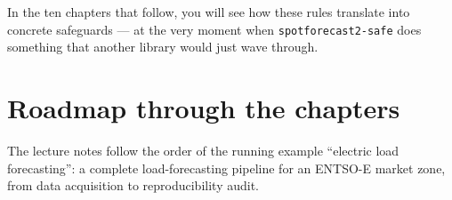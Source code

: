 \documentclass[
  english,
  letterpaper,
]{scrbook}
\begin{document}
In the ten chapters that follow, you will see how these rules translate
into concrete safeguards --- at the very moment when
\texttt{spotforecast2-safe} does something that another library would
just wave through.

\section*{Roadmap through the
chapters}\label{roadmap-through-the-chapters}


The lecture notes follow the order of the running example ``electric
load forecasting'': a complete load-forecasting pipeline for an ENTSO-E
market zone, from data acquisition to reproducibility audit.
\end{document}
